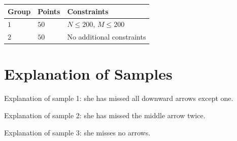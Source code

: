 \noindent
\begin{tabular}{| l | l | l |}
  \hline
  Group & Points & Constraints \\ \hline
  $1$   & $50$       & $N \leq 200$, $M \leq 200$ \\ \hline
  $2$   & $50$       & No additional constraints \\ \hline
\end{tabular}

\section*{Explanation of Samples}
Explanation of sample 1: she has missed all downward arrows except one.

Explanation of sample 2: she has missed the middle arrow twice.

Explanation of sample 3: she misses no arrows.

